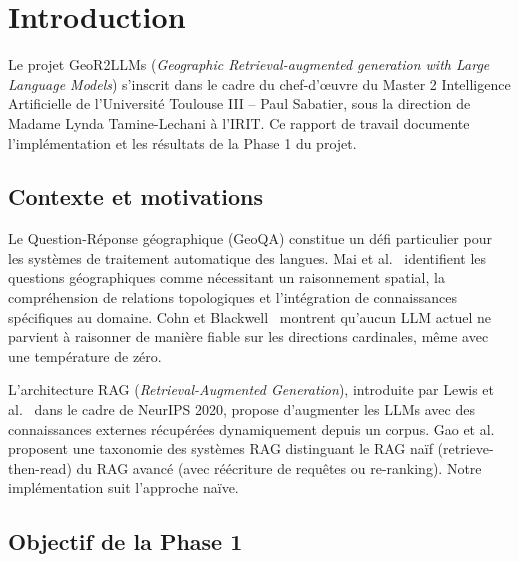 \documentclass[12pt,a4paper]{article}
\begin{document}
\newpage
\tableofcontents
\newpage

\section{Introduction}
\label{sec:introduction}

Le projet GeoR2LLMs (\textit{Geographic Retrieval-augmented generation with Large Language Models}) s'inscrit dans le cadre du chef-d'\oe uvre du Master 2 Intelligence Artificielle de l'Université Toulouse III -- Paul Sabatier, sous la direction de Madame Lynda Tamine-Lechani à l'IRIT. Ce rapport de travail documente l'implémentation et les résultats de la Phase 1 du projet.

\subsection{Contexte et motivations}

Le Question-Réponse géographique (GeoQA) constitue un défi particulier pour les systèmes de traitement automatique des langues. Mai et al.~\cite{mai_geographic_2021} identifient les questions géographiques comme nécessitant un raisonnement spatial, la compréhension de relations topologiques et l'intégration de connaissances spécifiques au domaine. Cohn et Blackwell~\cite{cohn_evaluating_2024} montrent qu'aucun LLM actuel ne parvient à raisonner de manière fiable sur les directions cardinales, même avec une température de zéro.

L'architecture RAG (\textit{Retrieval-Augmented Generation}), introduite par Lewis et al.~\cite{lewis2020retrieval} dans le cadre de NeurIPS 2020, propose d'augmenter les LLMs avec des connaissances externes récupérées dynamiquement depuis un corpus. Gao et al.~\cite{gao2023ragsurvey} proposent une taxonomie des systèmes RAG distinguant le RAG na\"if (retrieve-then-read) du RAG avancé (avec réécriture de requêtes ou re-ranking). Notre implémentation suit l'approche na\"ive.

\subsection{Objectif de la Phase 1}
\end{document}
